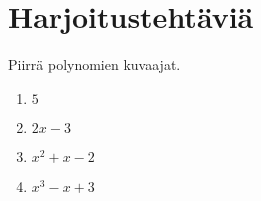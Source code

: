 %
%
%
%
%
%
%
%
%

\section{Harjoitustehtäviä}
\begin{tehtava}
	Piirrä polynomien kuvaajat.
	\begin{enumerate}
		\item $5$
		\item $2x-3$
		\item $x^2+x-2$
		\item $x^3-x+3$
	\end{enumerate}

	\begin{vastaus}
	\end{vastaus}
\end{tehtava}

